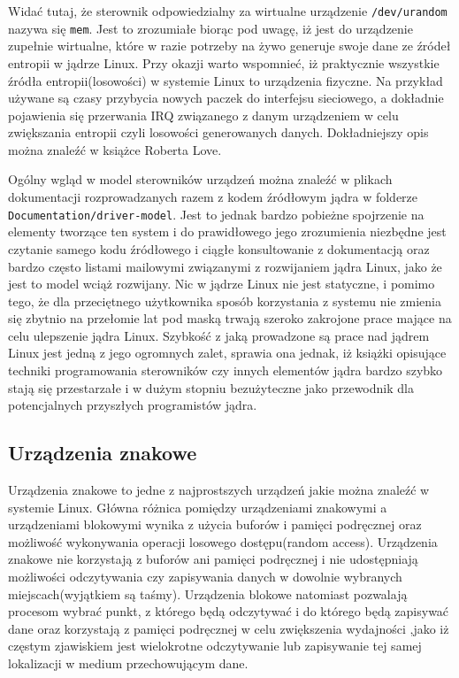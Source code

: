\documentclass[10pt]{scrartcl}
\begin{document}
Widać tutaj, że sterownik odpowiedzialny za wirtualne urządzenie \texttt{/dev/urandom} nazywa się \texttt{mem}. Jest to zrozumiałe biorąc pod uwagę, iż jest do urządzenie zupełnie wirtualne, które w razie potrzeby na żywo generuje swoje dane ze źródeł entropii w jądrze Linux.  Przy okazji warto wspomnieć, iż praktycznie wszystkie źródła entropii(losowości) w systemie Linux to urządzenia fizyczne. Na przykład używane są czasy przybycia nowych paczek do interfejsu sieciowego, a dokładnie pojawienia się przerwania IRQ związanego z danym urządzeniem w celu zwiększania entropii czyli losowości generowanych danych.  Dokładniejszy opis można znaleźć w książce Roberta Love\cite{linuxkerneldevel}.

Ogólny wgląd w model sterowników urządzeń można znaleźć w plikach dokumentacji rozprowadzanych razem z kodem źródłowym jądra w folderze \texttt{Documentation/driver-model}. Jest to jednak bardzo pobieżne spojrzenie na elementy tworzące ten system i do prawidłowego jego zrozumienia niezbędne jest czytanie samego kodu źródłowego i ciągłe konsultowanie z dokumentacją oraz bardzo często listami mailowymi związanymi z rozwijaniem jądra Linux, jako że jest to model wciąż rozwijany. Nic w jądrze Linux nie jest statyczne, i pomimo tego, że dla przeciętnego użytkownika sposób korzystania z systemu nie zmienia się zbytnio na przełomie lat pod maską trwają szeroko zakrojone prace mające na celu ulepszenie jądra Linux. Szybkość z jaką prowadzone są prace nad jądrem Linux jest jedną z jego ogromnych zalet, sprawia ona jednak, iż książki opisujące techniki programowania sterowników czy innych elementów jądra bardzo szybko stają się przestarzałe i w dużym stopniu bezużyteczne jako przewodnik dla potencjalnych przyszłych programistów jądra.

\subsection{Urządzenia znakowe}
\label{chardevs}

Urządzenia znakowe to jedne z najprostszych urządzeń jakie można znaleźć w systemie Linux. Główna różnica pomiędzy urządzeniami znakowymi a urządzeniami blokowymi wynika z użycia buforów i pamięci podręcznej oraz możliwość wykonywania operacji losowego dostępu(random access).  Urządzenia znakowe nie korzystają z buforów ani pamięci podręcznej i nie udostępniają możliwości odczytywania czy zapisywania danych w dowolnie wybranych miejscach(wyjątkiem są taśmy). Urządzenia blokowe natomiast pozwalają procesom wybrać punkt, z którego będą odczytywać i do którego będą zapisywać dane oraz korzystają z pamięci podręcznej w celu zwiększenia wydajności ,jako iż częstym zjawiskiem jest wielokrotne odczytywanie lub zapisywanie tej samej lokalizacji w medium przechowującym dane.
\end{document}
